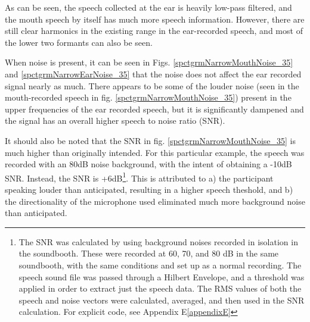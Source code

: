\documentclass[dissertation,copyright]{uathesis}
\begin{document}
As can be seen, the speech collected at the ear is heavily low-pass filtered, and the mouth speech by itself has much more speech information.
However, there are still clear harmonics in the existing range in the ear-recorded speech, and most of the lower two formants can also be seen.

When noise is present, it can be seen in Figs. \ref{spctgrmNarrowMouthNoise_35} and \ref{spctgrmNarrowEarNoise_35} that the noise does not affect the ear recorded signal nearly as much.  There appears to be some of the louder noise (seen in the mouth-recorded speech in fig. \ref{spctgrmNarrowMouthNoise_35}) present in the upper frequencies of the ear recorded speech, but it is significantly dampened and the signal has an overall higher speech to noise ratio (SNR).

It should also be noted that the SNR in fig. \ref{spctgrmNarrowMouthNoise_35} is much higher than originally intended.  For this particular example, the speech was recorded with an 80dB noise background, with the intent of obtaining a -10dB SNR.  Instead, the SNR is +6dB\footnote{The SNR was calculated by using background noises recorded in isolation in the soundbooth.  These were recorded at 60, 70, and 80 dB in the same soundbooth, with the same conditions and set up as a normal recording.  The speech sound file was passed through a Hilbert Envelope, and a threshold was applied in order to extract just the speech data.  The RMS values of both the speech and noise vectors were calculated, averaged, and then used in the SNR calculation.  For explicit code, see Appendix E\ref{appendixE}}.  This is attributed to a) the participant speaking louder than anticipated, resulting in a higher speech theshold, and b) the directionality of the microphone used eliminated much more background noise than anticipated.
\end{document}
